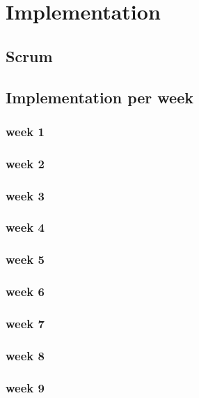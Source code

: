 \newpage
\section{Implementation}

\subsection{Scrum}

\subsection{Implementation per week}

\subsubsection{week 1}
\subsubsection{week 2}
\subsubsection{week 3}
\subsubsection{week 4}
\subsubsection{week 5}
\subsubsection{week 6}
\subsubsection{week 7}
\subsubsection{week 8}
\subsubsection{week 9}
